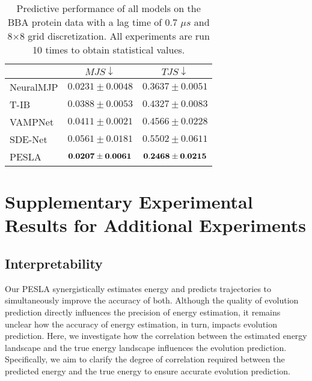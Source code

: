 \begin{table}[!ht]
    \centering
    \caption{Predictive performance of all models on the BBA protein data with a lag time of 0.7 $\mu s$ and 8×8 grid discretization. All experiments are run 10 times to obtain statistical values.}
    \label{tab:bba_prediction}
    \begin{tabular}{l|cc}
        \hline
         & $MJS \downarrow$ & $TJS \downarrow$ \\
        \hline
        NeuralMJP & $0.0231\pm0.0048$ &  $0.3637\pm0.0051$ \\
        T-IB &  $0.0388\pm0.0053$  & $0.4327\pm0.0083$  \\
        VAMPNet & $0.0411\pm0.0021$  & $0.4566\pm0.0228$ \\
        SDE-Net & $0.0561\pm0.0181$  & $0.5502\pm0.0611$ \\
        PESLA & $\bf{0.0207\pm0.0061}$ &  $\bf{0.2468\pm0.0215}$ \\
        \hline           
    \end{tabular}
\end{table}


\section{Supplementary Experimental Results for Additional Experiments} \label{sec:comprehensive_evaluation}


\subsection{Interpretability}

Our PESLA synergistically estimates energy and predicts trajectories to simultaneously improve the accuracy of both. Although the quality of evolution prediction directly influences the precision of energy estimation, it remains unclear how the accuracy of energy estimation, in turn, impacts evolution prediction. Here, we investigate how the correlation between the estimated energy landscape and the true energy landscape influences the evolution prediction. Specifically, we aim to clarify the degree of correlation required between the predicted energy and the true energy to ensure accurate evolution prediction.

